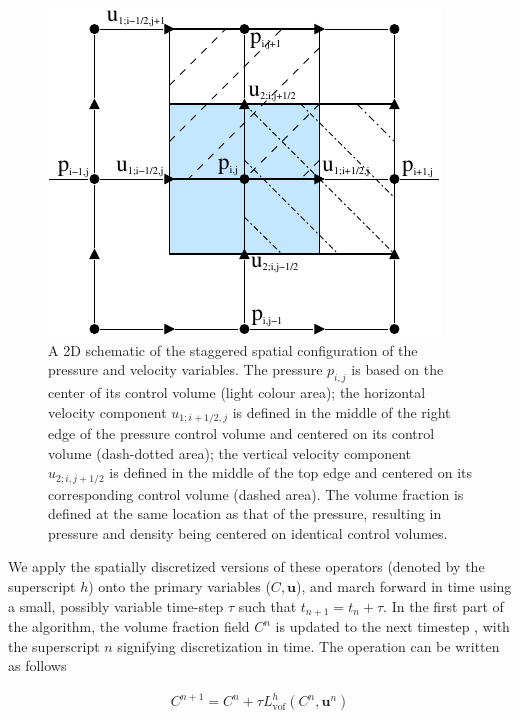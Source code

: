 \begin{figure}
\begin{center}
\includegraphics[width=\textwidth]{plots/stag-grid.pdf}
\end{center}
\caption{A 2D schematic of the staggered spatial configuration of the
pressure and velocity variables.
The pressure $p_{i,j}$ is based on the center of its control volume (light colour area);
the horizontal velocity component $u_{1;i+1/2,j}$ is defined in the middle of the
right edge of the pressure control volume and centered on its control volume
(dash-dotted area); the vertical velocity component $u_{2;i,j+1/2}$ is defined in the
middle of the top edge and centered on its corresponding control volume (dashed area).
The volume fraction is defined at the same location as that of the pressure, 
resulting in pressure and density being centered on identical control volumes.  
}
\label{stag-grid}
\end{figure}

We apply the spatially discretized versions of these operators (denoted by the superscript $h$) 
onto the primary variables ($C,\boldsymbol{u}$), and march forward in time using a small, 
possibly variable time-step $\tau$ such that $t_{n+1} = t_{n} + \tau$. 
In the first part of the algorithm, the volume fraction field $C^{n}$ is updated to the next timestep 
, with the superscript $n$ signifying discretization in time. 
The operation can be written as follows        

\begin{align}
	C^{n+1} = C^{n} + \tau L^{h}_{\textrm{vof}}\left( C^{n},\boldsymbol{u}^{n}\right)  
\label{cvof_update}
\end{align}

